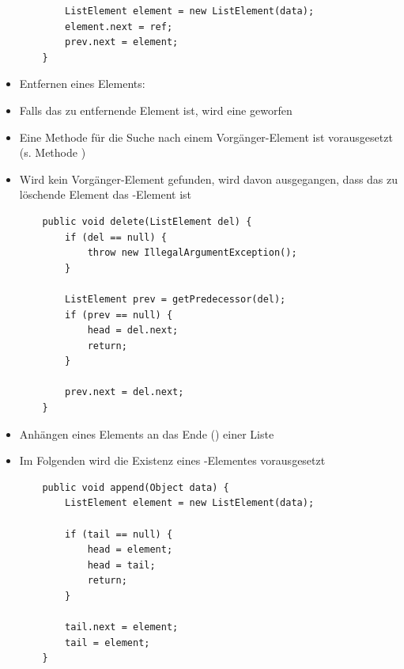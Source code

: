 \begin{itemize}
\begin{verbatim}
        ListElement element = new ListElement(data);
        element.next = ref;
        prev.next = element;
    }
    \end{verbatim}
    \item Entfernen eines Elements:
    \item[] Falls das zu entfernende Element  ist, wird eine  geworfen
    \item[] Eine Methode für die Suche nach einem Vorgänger-Element ist
    vorausgesetzt (s. Methode )
    \item[] Wird kein Vorgänger-Element gefunden, wird davon ausgegangen, dass
    das zu löschende Element das -Element ist
    \begin{verbatim}
    public void delete(ListElement del) {
        if (del == null) {
            throw new IllegalArgumentException();
        }

        ListElement prev = getPredecessor(del);
        if (prev == null) {
            head = del.next;
            return;
        }

        prev.next = del.next;
    }
    \end{verbatim}
    \item Anhängen eines Elements an das Ende () einer Liste
    \item[] Im Folgenden wird die Existenz eines -Elementes vorausgesetzt
    \begin{verbatim}
    public void append(Object data) {
        ListElement element = new ListElement(data);

        if (tail == null) {
            head = element;
            head = tail;
            return;
        }

        tail.next = element;
        tail = element;
    }
    \end{verbatim}
\end{itemize}


